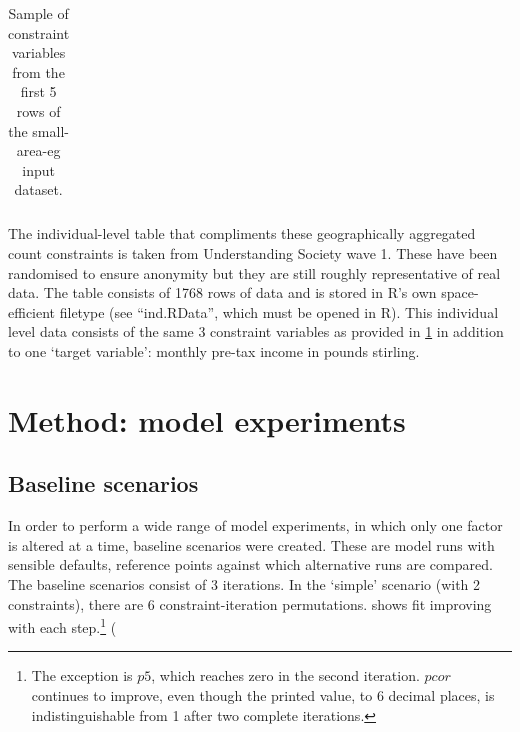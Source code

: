 \documentclass[a4paper,10pt]{article}
\begin{document}
\begin{table}[htbp]
\caption{Sample of constraint variables from the first 5 rows of the small-area-eg input dataset.}
\begin{center}
\begin{tabular}{rrrrr}
\toprule
\bottomrule
\end{tabular}
\end{center}
\label{t3}
\end{table}

The individual-level table that compliments these geographically aggregated count constraints 
is taken from Understanding Society wave 1. These have been randomised to ensure anonymity
but they are still roughly representative of real data. The table consists of 1768 rows of 
data and is stored in R’s own space-efficient filetype (see ``ind.RData'', which must be opened in 
R). This individual level data consists of the same 3
constraint variables as provided in \cref{t3} in addition
to one `target variable': monthly pre-tax income in pounds stirling. 



\section{Method: model experiments}
\subsection{Baseline scenarios}
In order to perform a wide range of model experiments, 
in which only one factor is altered at a time, 
baseline scenarios were created. These are model runs with sensible 
defaults, reference points against which alternative runs are compared.
The baseline scenarios consist of 3 iterations. In the ‘simple’ scenario (with 2 constraints), 
there are 6 constraint-iteration permutations.
 shows 
fit improving with each step.\footnote{The exception is $p5$,
which reaches zero in the second iteration. $pcor$ continues to improve, 
even though the printed value, to 6 decimal places, is
indistinguishable from 1 after two complete iterations.} (
\end{document}
